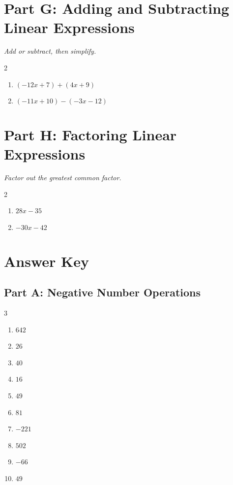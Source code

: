 \documentclass[11pt]{article}
\begin{document}
\section*{Part G: Adding and Subtracting Linear Expressions}
\noindent\textit{Add or subtract, then simplify.}
\begin{multicols}{2}
\begin{enumerate}
  \item $(-12x + 7) + (4x + 9)$
  \vspace{1.4cm}
  \item $(-11x + 10) - (-3x - 12)$
  \vspace{1.4cm}
\end{enumerate}
\end{multicols}

\section*{Part H: Factoring Linear Expressions}
\noindent\textit{Factor out the greatest common factor.}
\begin{multicols}{2}
\begin{enumerate}
  \item $28x - 35$
  \vspace{1.3cm}
  \item $-30x - 42$
  \vspace{1.3cm}
\end{enumerate}
\end{multicols}

\newpage
{}
\section*{Answer Key}
\subsection*{Part A: Negative Number Operations}
\begin{multicols}{3}
\begin{enumerate}
  \item $642$
  \item $26$
  \item $40$
  \item $16$
  \item $49$
  \item $81$
  \item $-221$
  \item $502$
  \item $-66$
  \item $49$
\end{enumerate}
\end{multicols}
\end{document}

